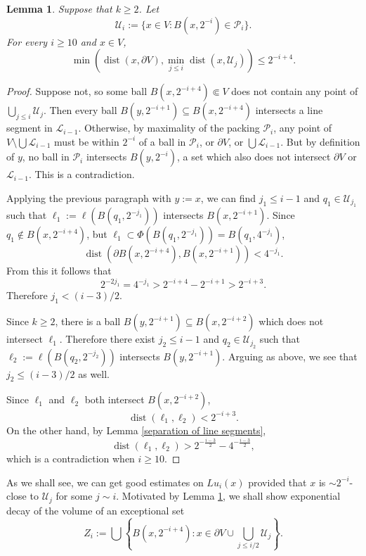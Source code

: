 \documentclass[reqno,11pt]{amsart}
\DeclareMathOperator{\dist}{dist}
\newtheorem{lemma}[theorem]{Lemma}
\theoremstyle{definition}
\numberwithin{equation}{section}
\begin{document}
\begin{lemma}\label{almost density of balls}
Suppose that $k \geq 2$. Let
$$\mathscr U_i := \{x \in V: B(x, 2^{-i}) \in \mathscr P_i\}.$$
For every $i \geq 10$ and $x \in V$,
$$\min\left(\dist(x, \partial V), \min_{j \leq i} \dist(x, \mathscr U_j)\right) \leq 2^{-i + 4}.$$
\end{lemma}
\begin{proof}
Suppose not, so some ball $B(x, 2^{-i + 4}) \Subset V$ does not contain any point of $\bigcup_{j \leq i} \mathscr U_j$.
Then every ball $B(y, 2^{-i + 1}) \subseteq B(x, 2^{-i + 4})$ intersects a line segment in $\mathscr L_{i - 1}$.
Otherwise, by maximality of the packing $\mathscr P_i$, any point of $V \setminus \bigcup \mathscr L_{i - 1}$ must be within $2^{-i}$ of a ball in $\mathscr P_i$, or $\partial V$, or $\bigcup \mathscr L_{i - 1}$.
But by definition of $y$, no ball in $\mathscr P_i$ intersects $B(y, 2^{-i})$, a set which also does not intersect $\partial V$ or $\mathscr L_{i - 1}$.
This is a contradiction.

Applying the previous paragraph with $y := x$, we can find $j_1 \leq i - 1$ and $q_1 \in \mathscr U_{j_1}$ such that $\ell_1 := \ell(B(q_1, 2^{-j_1}))$ intersects $B(x, 2^{-i + 1})$.
Since $q_1 \notin B(x, 2^{-i + 4})$, but $\ell_1 \subset \Phi(B(q_1, 2^{-j_1})) = B(q_1, 4^{-{j_1}})$,
$$\dist(\partial B(x, 2^{-i + 4}), B(x, 2^{-i + 1})) < 4^{-j_1}.$$
From this it follows that
$$2^{-2j_1} = 4^{-j_1} > 2^{-i + 4} - 2^{-i + 1} > 2^{-i + 3}.$$
Therefore $j_1 < (i - 3)/2$.

Since $k \geq 2$, there is a ball $B(y, 2^{-i + 1}) \subseteq B(x, 2^{-i + 2})$ which does not intersect $\ell_1$.
Therefore there exist $j_2 \leq i - 1$ and $q_2 \in \mathscr U_{j_2}$ such that $\ell_2 := \ell(B(q_2, 2^{-j_2}))$ intersects $B(y, 2^{-i + 1})$.
Arguing as above, we see that $j_2 \leq (i - 3)/2$ as well.

Since $\ell_1$ and $\ell_2$ both intersect $B(x, 2^{-i + 2})$,
$$\dist(\ell_1, \ell_2) < 2^{-i + 3}.$$
On the other hand, by Lemma \ref{separation of line segments},
$$\dist(\ell_1, \ell_2) > 2^{-\frac{i - 3}{2}} - 4^{-\frac{i - 3}{2}},$$
which is a contradiction when $i \geq 10$.
\end{proof}

As we shall see, we can get good estimates on $Lu_i(x)$ provided that $x$ is $\sim 2^{-i}$-close to $\mathscr U_j$ for some $j \sim i$.
Motivated by Lemma \ref{almost density of balls}, we shall show exponential decay of the volume of an exceptional set
\begin{equation}\label{exponential exceptional set}
Z_i := \bigcup \left\{B(x, 2^{-i+4}): x \in \partial V \cup \bigcup_{j \leq i/2} \mathscr U_j\right\}.
\end{equation}
\end{document}
